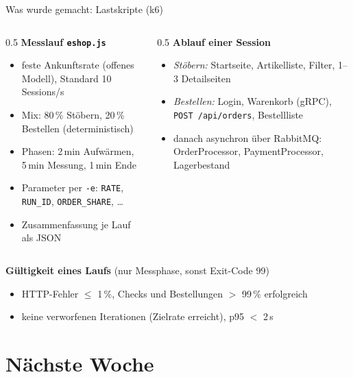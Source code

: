 \documentclass[10pt, aspectratio=169]{beamer}
\begin{document}
\begin{frame}{Was wurde gemacht: Lastskripte (k6)}
  \begin{columns}[T]
    \begin{column}{0.5\textwidth}
      \textbf{Messlauf \texttt{eshop.js}}
      \begin{itemize}\small
        \item feste Ankunftsrate (offenes Modell), Standard 10 Sessions/s
        \item Mix: 80\,\% Stöbern, 20\,\% Bestellen (deterministisch)
        \item Phasen: 2\,min Aufwärmen, 5\,min Messung, 1\,min Ende
        \item Parameter per \texttt{-e}: \texttt{RATE}, \texttt{RUN\_ID}, \texttt{ORDER\_SHARE}, \dots
        \item Zusammenfassung je Lauf als JSON
      \end{itemize}
    \end{column}
    \begin{column}{0.5\textwidth}
      \textbf{Ablauf einer Session}
      \begin{itemize}\small
        \item \emph{Stöbern:} Startseite, Artikelliste, Filter, 1--3 Detailseiten
        \item \emph{Bestellen:} Login, Warenkorb (gRPC), \texttt{POST /api/orders}, Bestellliste
        \item danach asynchron über RabbitMQ: OrderProcessor, PaymentProcessor, Lagerbestand
      \end{itemize}
    \end{column}
  \end{columns}

  \vspace{0.4cm}
  \textbf{Gültigkeit eines Laufs} {\small(nur Messphase, sonst Exit-Code 99)}
  \begin{itemize}\small
    \item HTTP-Fehler $\le$ 1\,\%, Checks und Bestellungen $>$ 99\,\% erfolgreich
    \item keine verworfenen Iterationen (Zielrate erreicht), p95 $<$ 2\,s
  \end{itemize}
\end{frame}

\section{Nächste Woche}
\end{document}
